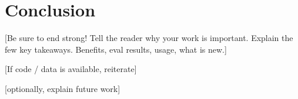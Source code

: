 \section{Conclusion}
\label{SEC:conclusion}
[Be sure to end strong!  Tell the reader why your work is important.  
Explain the few key takeaways.  Benefits, eval results, usage, what is new.]

[If code / data is available, reiterate]

[optionally, explain future work]



